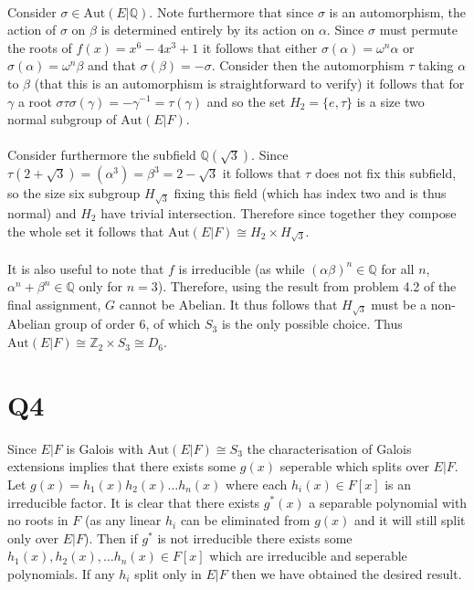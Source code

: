 \documentclass{article}
\begin{document}
\paragraph{}
Consider $\sigma \in \text{Aut}(E|\mathbb{Q})$. Note furthermore that since $\sigma$ is an 
automorphism, the action of $\sigma$ on $\beta$ is determined entirely by its action on 
$\alpha$. Since $\sigma$ must permute the roots of 
$f(x) = x^6 - 4x^3 + 1$ it follows that either $\sigma(\alpha) = \omega^n\alpha$ or $\sigma(\alpha) = \omega^n\beta$ and 
that $\sigma(\beta) = -\sigma$. 
Consider then the automorphism $\tau$ taking $\alpha$ to $\beta$ (that this is an automorphism 
is straightforward to verify) it follows that for $\gamma$ a root $\sigma\tau\sigma(\gamma) = -\gamma^{-1} = \tau(\gamma)$ 
and so the set $H_2 = \{e,\tau\}$ is a size two normal subgroup of $\text{Aut}(E|F)$.

\paragraph{}
Consider furthermore the subfield $\mathbb{Q}(\sqrt{3})$. Since $\tau(2 + \sqrt{3}) = (\alpha^3) = \beta^3 = 2 - \sqrt{3}$ 
it follows that $\tau$ does not fix this subfield, so the size six subgroup $H_{\sqrt{3}}$ fixing 
this field (which has index 
two and is thus normal) and $H_2$ have trivial intersection. Therefore since together they 
compose the whole set it follows that $\text{Aut}(E|F) \cong H_2 \times H_{\sqrt{3}}$.

\paragraph{}
It is also useful to note that $f$ is irreducible (as while $(\alpha\beta)^n \in \mathbb{Q}$ for all 
$n$, $\alpha^n+\beta^n \in \mathbb{Q}$ only for $n=3$). Therefore, using the result from problem 4.2 
of the final assignment, $G$ cannot be Abelian. It thus follows that $H_{\sqrt{3}}$ must be a 
non-Abelian group of order 6, of which $S_3$ is the only possible choice. Thus $\text{Aut}(E|F) \cong \mathbb{Z}_2 \times S_3 \cong D_6$.

\section*{Q4}
Since $E|F$ is Galois with $\text{Aut}(E|F) \cong S_3$ the characterisation of Galois 
extensions implies that there exists some $g(x)$ seperable which splits over $E|F$. Let 
$g(x) = h_1(x)h_2(x)\dots h_n(x)$ where each $h_i(x) \in F[x]$ is an irreducible factor. It 
is clear that there exists $g^*(x)$ a separable polynomial with no roots in $F$ (as any linear $h_i$ 
can be eliminated from $g(x)$ and it will still split only over $E|F$). Then if $g^*$ is not 
irreducible there exists some $h_1(x),h_2(x),\dots h_n(x) \in F[x]$ which are irreducible and seperable 
polynomials. If any $h_i$ split only in $E|F$ then we have obtained the desired result.
\end{document}

